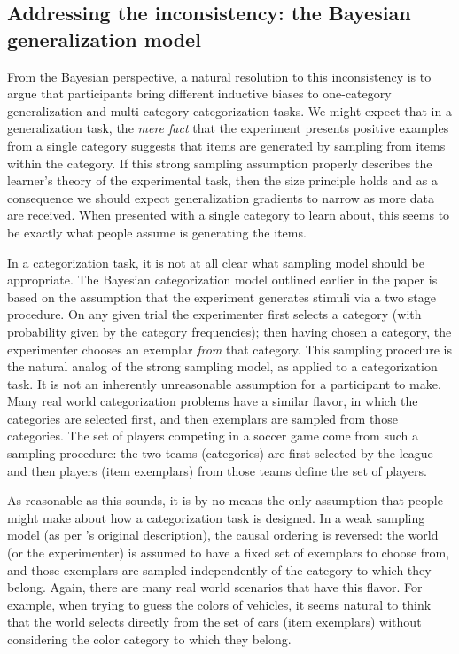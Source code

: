 \documentclass[doc,apacite]{apa6}
\newcommand{\possessivecite}[1]{\citeauthor{#1}'s \citeyear{#1}}
\begin{document}
\subsection{Addressing the inconsistency: the Bayesian generalization model}

From the Bayesian perspective, a natural resolution to this inconsistency is to argue that participants bring different inductive biases to one-category generalization and multi-category categorization tasks. We might expect that in a generalization task, the {\it mere fact} that the experiment presents positive examples from a single category suggests that items are generated by sampling from items within the category. If this strong sampling assumption properly describes the learner's theory of the experimental task, then the size principle holds and as a consequence we should expect generalization gradients to narrow as more data are received. When presented with a single category to learn about, this seems to be exactly what people assume is generating the items.

In a categorization task, it is not at all clear what sampling model should be appropriate. %
The Bayesian categorization model outlined earlier in the paper is based on the assumption that the experiment generates stimuli via a two stage procedure. On any given trial the experimenter first selects a category (with probability given by the category frequencies); then having chosen a category, the experimenter chooses an exemplar {\it from} that category. This sampling procedure is the natural analog of the strong sampling model, as applied to a categorization task. It is not an inherently unreasonable assumption for a participant to make. Many real world categorization problems have a similar flavor, in which the categories are selected first, and then exemplars are sampled from those categories.
The set of players competing in a soccer game come from such a sampling procedure: the two teams (categories) are first selected by the league and then players (item exemplars) from those teams define the set of players.

As reasonable as this sounds, it is by no means the only assumption that people might make about how a categorization task is designed. In a weak sampling model (as per \possessivecite{shepard1987universalsim} original description), the causal ordering is reversed: the world (or the experimenter) is assumed to have a fixed set of exemplars to choose from, and those exemplars are sampled independently of the category to which they belong. Again, there are many real world scenarios that have this flavor. For example, when trying to guess the colors of vehicles, it seems natural to think that the world selects directly from the set of cars (item exemplars) without considering the color category to which they belong.
\end{document}
